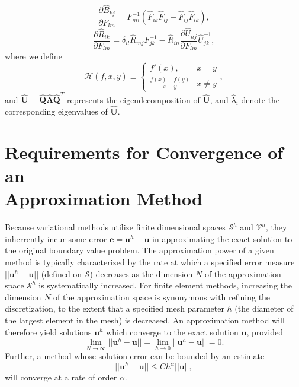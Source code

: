 	\begin{equation}
		\frac{\partial \hat{B}_{kj}}{\partial F_{lm}} = F^{-1}_{mi} (\hat{F}_{ik} \hat{F}_{lj} + \hat{F}_{ij} \hat{F}_{lk}),
	\end{equation}
	\begin{equation}
		\frac{\partial \hat{R}_{ik}}{\partial F_{lm}} = \delta_{il} \hat{R}_{mj} F^{-1}_{jk} - \hat{R}_{in} \frac{\partial \hat{U}_{nj}}{\partial F_{lm}} \hat{U}_{jk}^{-1},
	\end{equation}
	where we define
	\begin{equation}
		\mathcal{H} (f, x, y) \equiv \left\{ \begin{array}{cc} f'(x), & x = y \\
		\frac{f(x) - f(y)}{x - y} & x \neq y \end{array} \right. ,
	\end{equation}
	and $\hat{\mathbf{U}} = \hat{\mathbf{Q}} \hat{\boldsymbol{\Lambda}} \hat{\mathbf{Q}}^T$ represents the eigendecomposition of $\hat{\mathbf{U}}$, and $\hat{\lambda}_i$ denote the corresponding eigenvalues of $\hat{\mathbf{U}}$.

\section{Requirements for Convergence of an \\ Approximation Method}

Because variational methods utilize finite dimensional spaces $\mathcal{S}^h$ and $\mathcal{V}^h$, they inherrently incur some error $\mathbf{e} = \mathbf{u}^h - \mathbf{u}$ in approximating the exact solution to the original boundary value problem. The  approximation power of a given method is typically characterized by the rate at which a specified error measure $||\mathbf{u}^h - \mathbf{u}||$ (defined on $\mathcal{S}$) decreases as the dimension $N$ of the approximation space $\mathcal{S}^h$ is systematically increased. For finite element methods, increasing the dimension $N$ of the approximation space is synonymous with refining the discretization, to the extent that a specified mesh parameter $h$ (the diameter of the largest element in the mesh) is decreased. An approximation method will therefore yield solutions $\mathbf{u}^h$ which converge to the exact solution $\mathbf{u}$, provided
\begin{equation}
	\lim_{N \rightarrow \infty} ||\mathbf{u}^h - \mathbf{u}|| = \lim_{h \rightarrow 0} ||\mathbf{u}^h - \mathbf{u}|| = 0.
\end{equation}
Further, a method whose solution error can be bounded by an estimate
\begin{equation}
	||\mathbf{u}^h - \mathbf{u}|| \leq C h^\alpha ||\mathbf{u}||,
\end{equation}
will converge at a rate of order $\alpha$.

